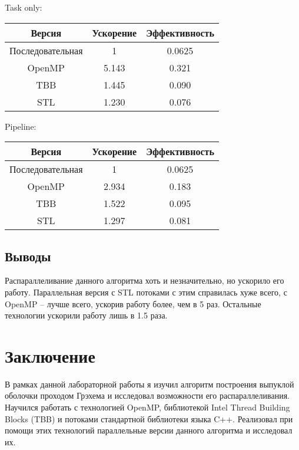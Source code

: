 \documentclass[a4paper]{article}
\begin{document}
\smallskip
Task only:

\begin{center}
    \begin{tabular}{ |c|c|c| }
        \hline
        Версия & Ускорение & Эффективность \\
        \hline
        Последовательная & 1 & 0.0625 \\
        OpenMP & 5.143 & 0.321 \\
        TBB & 1.445 & 0.090 \\
        STL & 1.230 & 0.076 \\
        \hline
    \end{tabular}
\end{center}

Pipeline:

\begin{center}
    \begin{tabular}{ |c|c|c| }
        \hline
        Версия & Ускорение & Эффективность \\
        \hline
        Последовательная & 1 & 0.0625 \\
        OpenMP & 2.934 & 0.183 \\
        TBB & 1.522 & 0.095 \\
        STL & 1.297 & 0.081 \\
        \hline
    \end{tabular}
\end{center}

\subsection{Выводы}

Распараллеливание данного алгоритма хоть и незначительно, но ускорило его работу. 
Параллельная версия с STL потоками с этим справилась хуже всего, с OpenMP -- лучше всего, ускорив работу более, чем в 5 раз. 
Остальные технологии ускорили работу лишь в 1.5 раза. 
\newpage
\section*{Заключение}

В рамках данной лабораторной работы я изучил алгоритм построения выпуклой оболочки 
проходом Грэхема и исследовал возможности его распараллеливания. Научился работать с технологией OpenMP, библиотекой Intel Thread Building Blocks (TBB) и потоками стандартной библиотеки языка C++.
Реализовал при помощи этих технологий параллельные версии данного алгоритма и исследовал их.
\end{document}
